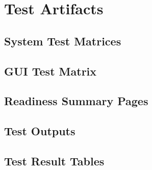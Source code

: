 \chapter{Test Artifacts}

\section{System Test Matrices}

\section{GUI Test Matrix}

\section{Readiness Summary Pages}

\section{Test Outputs}

\section{Test Result Tables}
